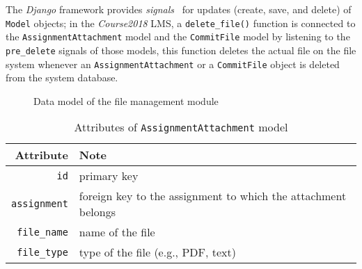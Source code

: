 The \emph{Django} framework provides \emph{signals}~\cite{djangoSignal}
for updates (create, save, and delete) of \texttt{Model} objects; in the
\emph{Course2018} LMS, a \texttt{delete\_file()} function is connected to
the \texttt{AssignmentAttachment} model and the \texttt{CommitFile} model by
listening to the \texttt{pre\_delete} signals of those models, this function
deletes the actual file on the file system whenever an
\texttt{AssignmentAttachment} or a \texttt{CommitFile} object is deleted from
the system database.

\begin{figure}[H]
    \centering
    \caption{Data model of the file management module}
    \label{fig:FILES_ER}
    \usetikzlibrary{er}

\end{figure}

\begin{table}[H]
    \centering
    \caption{Attributes of \texttt{AssignmentAttachment} model}
    \label{tab:ATTACH_FILE_ATTR}
    \renewcommand{\arraystretch}{1.3}
    \begin{tabular}[H]{r|l}
        \hline
        Attribute & Note \\
        \hline
        \hline
        \texttt{id} & primary key \\
        \hline
        \texttt{assignment} & foreign key to the assignment to which the
            attachment belongs \\
        \hline
        \texttt{file\_name} & name of the file\\
        \hline
        \texttt{file\_type} & type of the file (e.g., PDF, text) \\
        \hline
    \end{tabular}
\end{table}

